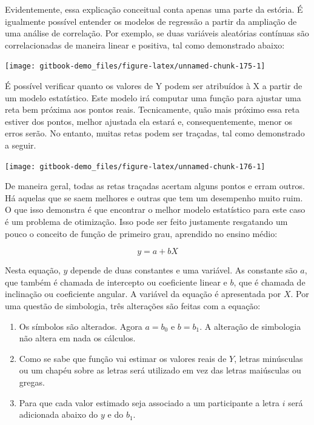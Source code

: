 \documentclass[
]{book}
\begin{document}
Evidentemente, essa explicação conceitual conta apenas uma parte da
estória. É igualmente possível entender os modelos de regressão a partir
da ampliação de uma análise de correlação. Por exemplo, se duas
variáveis aleatórias contínuas são correlacionadas de maneira linear e
positiva, tal como demonstrado abaixo:

\begin{center}\texttt{[image: gitbook-demo\_files/figure-latex/unnamed-chunk-175-1]} \end{center}

É possível verificar quanto os valores de Y podem ser atribuídos à X a
partir de um modelo estatístico. Este modelo irá computar uma função
para ajustar uma reta bem próxima aos pontos reais. Tecnicamente, quão
mais próximo essa reta estiver dos pontos, melhor ajustada ela estará e,
consequentemente, menor os erros serão. No entanto, muitas retas podem
ser traçadas, tal como demonstrado a seguir.

\begin{center}\texttt{[image: gitbook-demo\_files/figure-latex/unnamed-chunk-176-1]} \end{center}

De maneira geral, todas as retas traçadas acertam alguns pontos e erram
outros. Há aquelas que se saem melhores e outras que tem um desempenho
muito ruim. O que isso demonstra é que encontrar o melhor modelo
estatístico para este caso é um problema de otimização. Isso pode ser
feito justamente resgatando um pouco o conceito de função de primeiro
grau, aprendido no ensino médio:

\[y = a + bX\]

Nesta equação, \(y\) depende de duas constantes e uma variável. As
constante são \(a\), que também é chamada de intercepto ou coeficiente
linear e \(b\), que é chamada de inclinação ou coeficiente angular. A
variável da equação é apresentada por \(X\). Por uma questão de
simbologia, três alterações são feitas com a equação:

\begin{enumerate}
\def\labelenumi{(\roman{enumi})}
\item
  Os símbolos são alterados. Agora \(a = b_0\) e \(b = b_1\). A
  alteração de simbologia não altera em nada os cálculos.
\item
  Como se sabe que função vai estimar os valores reais de \(Y\), letras
  minúsculas ou um chapéu sobre as letras será utilizado em vez das
  letras maiúsculas ou gregas.
\item
  Para que cada valor estimado seja associado a um participante a letra
  \(i\) será adicionada abaixo do \(y\) e do \(b_1\).
\end{enumerate}
\end{document}
